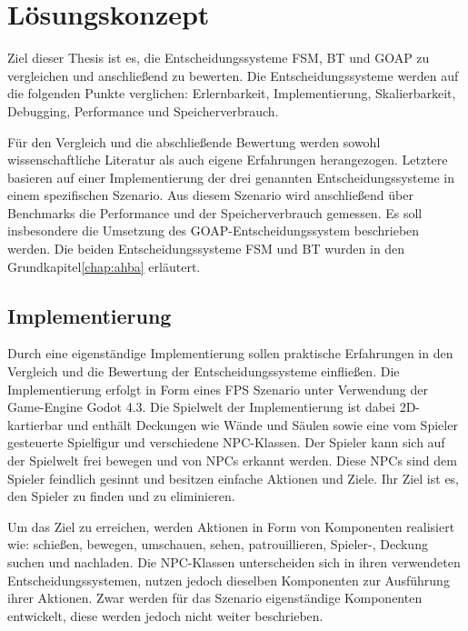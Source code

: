 \chapter{L\"{o}sungskonzept}
\label{chap:loesungskonzept}

Ziel dieser Thesis ist es, die Entscheidungssysteme FSM, BT und GOAP zu vergleichen und anschlie\ss{}end zu bewerten. Die Entscheidungssysteme werden auf die folgenden Punkte verglichen: Erlernbarkeit, Implementierung, Skalierbarkeit, Debugging, Performance und Speicherverbrauch.

F\"{u}r den Vergleich und die abschlie\ss{}ende Bewertung werden sowohl wissenschaftliche Literatur als auch eigene Erfahrungen herangezogen. Letztere basieren auf einer Implementierung der drei genannten Entscheidungssysteme in einem spezifischen Szenario. Aus diesem Szenario wird anschlie\ss{}end \"{u}ber Benchmarks die Performance und der Speicherverbrauch gemessen. Es soll insbesondere die Umsetzung des GOAP-Entscheidungssystem beschrieben werden. Die beiden Entscheidungssysteme FSM und BT wurden in den Grundkapitel\ref{chap:ahba} erl\"{a}utert.

\section{Implementierung}
\label{chap:lk implementierung}

Durch eine eigenst\"{a}ndige Implementierung sollen praktische Erfahrungen in den Vergleich und die Bewertung der Entscheidungssysteme einflie\ss{}en. Die Implementierung erfolgt in Form eines FPS Szenario unter Verwendung der Game-Engine Godot 4.3. Die Spielwelt der Implementierung ist dabei 2D-kartierbar und enth\"{a}lt Deckungen wie W\"{a}nde und S\"{a}ulen sowie eine vom Spieler gesteuerte Spielfigur und verschiedene NPC-Klassen. Der Spieler kann sich auf der Spielwelt frei bewegen und von NPCs erkannt werden. Diese NPCs sind dem Spieler feindlich gesinnt und besitzen einfache Aktionen und Ziele. Ihr Ziel ist es, den Spieler zu finden und zu eliminieren.

Um das Ziel zu erreichen, werden Aktionen in Form von Komponenten realisiert wie: schie\ss{}en, bewegen, umschauen, sehen, patrouillieren, Spieler-, Deckung suchen und nachladen. Die NPC-Klassen unterscheiden sich in ihren verwendeten Entscheidungssystemen, nutzen jedoch dieselben Komponenten zur Ausf\"{u}hrung ihrer Aktionen. Zwar werden f\"{u}r das Szenario eigenst\"{a}ndige Komponenten entwickelt, diese werden jedoch nicht weiter beschrieben.

